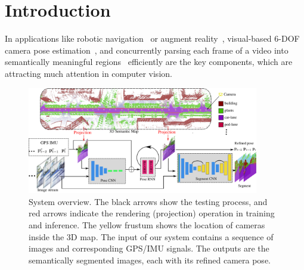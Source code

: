 
\vspace{-1.3\baselineskip}
\section{Introduction}
\vspace{-0.5\baselineskip}
\label{sec:introduction}
In applications like robotic navigation~\cite{ohno2003outdoor} or augment reality~\cite{DBLP:journals/corr/abs-1708-05006}, visual-based 6-DOF camera pose estimation~\cite{campbell2017globally,moreno2008pose,Kendall_2015_ICCV,coskun2017long}, and concurrently parsing each frame of a video into semantically meaningful regions~\cite{ZhaoSQWJ16,WuSH16e,ChenPSA17} efficiently are the key components, which are attracting much attention in computer vision.

\begin{figure}[t]
\center
\vspace{-1\baselineskip}
\includegraphics[width=0.9\textwidth]{fig/framework.pdf}
\caption{System overview. The black arrows show the testing process, and red arrows indicate the rendering (projection) operation in training and inference. The yellow frustum shows the location of cameras inside the 3D map. The input of our system contains a sequence of images and corresponding GPS/IMU signals. The outputs are the semantically segmented images, each with its refined camera pose.}
\label{fig:framework}
\vspace{-1\baselineskip}
\end{figure}

